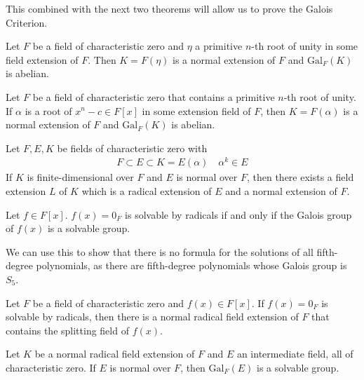 \documentclass{memoir}
\begin{document}
This combined with the next two theorems will allow us to prove the Galois Criterion.

\begin{thm}
	Let \(F\) be a field of characteristic zero and \(\eta \) a primitive \(n\)-th root of unity in some field extension of \(F\). Then \(K = F(\eta )\) is a normal extension of \(F\) and \(\textrm{Gal}_F(K)\) is abelian.
\end{thm}

\begin{thm}
	Let \(F\) be a field of characteristic zero that contains a primitive \(n\)-th root of unity. If \(\alpha \) is a root of \(x^{n}-c \in F[x]\) in some extension field of \(F\), then \(K = F(\alpha )\) is a normal extension of \(F\) and \(\textrm{Gal}_F(K)\) is abelian.
\end{thm}

\begin{lemma}
	Let \(F,E,K\) be fields of characteristic zero with
	\begin{align*}
		F\subset E\subset K = E(\alpha )\quad \alpha^k \in E
	\end{align*}
	If \(K\) is finite-dimensional over \(F\) and \(E\) is normal over \(F\), then there exists a field extension \(L\) of \(K\) which is a radical extension of \(E\) and a normal extension of \(F\).
\end{lemma}

\begin{thm}
Let \(f \in F[x]\). \(f(x) = 0_F\) is solvable by radicals if and only if the Galois group of \(f(x)\) is a solvable group.

\end{thm}

We can use this to show that there is no formula for the solutions of all fifth-degree polynomials, as there are fifth-degree polynomials whose Galois group is \(S_5\).

\begin{thm}
	Let \(F\) be a field of characteristic zero and \(f(x) \in F[x]\). If \(f(x) = 0_F\) is solvable by radicals, then there is a normal radical field extension of \(F\) that contains the splitting field of \(f(x)\).
\end{thm}

\begin{thm}
	Let \(K\) be a normal radical field extension of \(F\) and \(E\) an intermediate field, all of characteristic zero. If \(E\) is normal over \(F\), then \(\textrm{Gal}_F(E)\) is a solvable group.
\end{thm}
\end{document}
